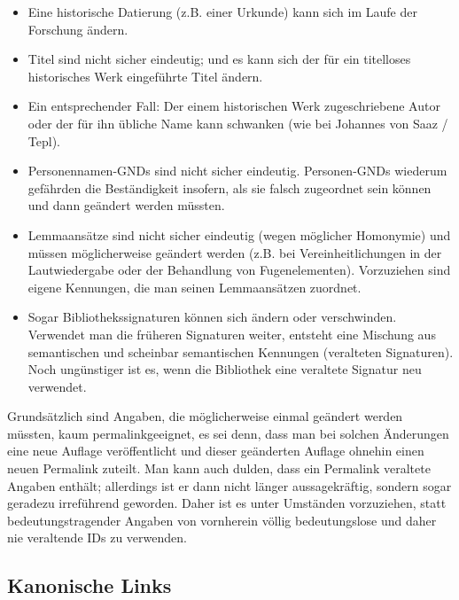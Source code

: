 \documentclass[12pt, a4paper]{article}
\begin{document}
\begin{itemize}
\item Eine historische Datierung (z.B. einer Urkunde) kann sich im Laufe der
Forschung ändern.

\item Titel sind nicht sicher eindeutig; und es kann sich der für ein
titelloses historisches Werk eingeführte Titel ändern.

\item Ein entsprechender Fall: Der einem historischen Werk zugeschriebene
Autor oder der für ihn übliche Name kann schwanken (wie bei Johannes von Saaz / Tepl).

\item Personennamen-GNDs sind nicht sicher eindeutig. Personen-GNDs wiederum
gefährden die Beständigkeit insofern, als sie falsch zugeordnet sein
können und dann geändert werden müssten.

\item Lemmaansätze sind nicht sicher eindeutig (wegen möglicher Homonymie)
und müssen möglicherweise geändert werden (z.B. bei Vereinheitlichungen
in der Lautwiedergabe oder der Behandlung von Fugenelementen).
Vorzuziehen sind eigene Kennungen, die man seinen Lemmaansätzen
zuordnet.

\item Sogar Bibliothekssignaturen können sich ändern oder verschwinden.
Verwendet man die früheren Signaturen weiter, entsteht eine Mischung aus
semantischen und scheinbar semantischen Kennungen (veralteten
Signaturen). Noch ungünstiger ist es, wenn die Bibliothek eine veraltete
Signatur neu verwendet.
\end{itemize}

Grundsätzlich sind Angaben, die möglicherweise einmal geändert werden
müssten, kaum permalinkgeeignet, es sei denn, dass man bei solchen
Änderungen eine neue Auflage veröffentlicht und dieser geänderten
Auflage ohnehin einen neuen Permalink zuteilt. Man kann auch dulden,
dass ein Permalink veraltete Angaben enthält; allerdings ist er dann
nicht länger aussagekräftig, sondern sogar geradezu irreführend
geworden. Daher ist es unter Umständen vorzuziehen, statt
bedeutungstragender Angaben von vornherein völlig bedeutungslose und
daher nie veraltende IDs zu verwenden.

\subsection{Kanonische Links}
\label{kanonische-links}
\end{document}
